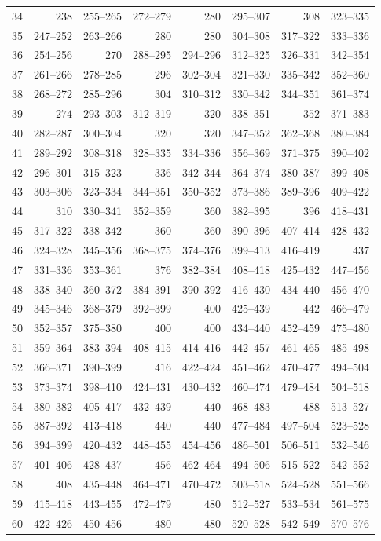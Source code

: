 \begin{longtable}{@{}r*{7}{r}@{}}
34&\(238\)&255--265&272--279&\(280\)&295--307&\(308\)&323--335\\
35&247--252&263--266&\(280\)&\(280\)&304--308&317--322&333--336\\
36&254--256&\(270\)&288--295&294--296&312--325&326--331&342--354\\
37&261--266&278--285&\(296\)&302--304&321--330&335--342&352--360\\
38&268--272&285--296&\(304\)&310--312&330--342&344--351&361--374\\
39&\(274\)&293--303&312--319&\(320\)&338--351&\(352\)&371--383\\
40&282--287&300--304&\(320\)&\(320\)&347--352&362--368&380--384\\
41&289--292&308--318&328--335&334--336&356--369&371--375&390--402\\
42&296--301&315--323&\(336\)&342--344&364--374&380--387&399--408\\
43&303--306&323--334&344--351&350--352&373--386&389--396&409--422\\
44&\(310\)&330--341&352--359&\(360\)&382--395&\(396\)&418--431\\
45&317--322&338--342&\(360\)&\(360\)&390--396&407--414&428--432\\
46&324--328&345--356&368--375&374--376&399--413&416--419&\(437\)\\
47&331--336&353--361&\(376\)&382--384&408--418&425--432&447--456\\
48&338--340&360--372&384--391&390--392&416--430&434--440&456--470\\
49&345--346&368--379&392--399&\(400\)&425--439&\(442\)&466--479\\
50&352--357&375--380&\(400\)&\(400\)&434--440&452--459&475--480\\
51&359--364&383--394&408--415&414--416&442--457&461--465&485--498\\
52&366--371&390--399&\(416\)&422--424&451--462&470--477&494--504\\
53&373--374&398--410&424--431&430--432&460--474&479--484&504--518\\
54&380--382&405--417&432--439&\(440\)&468--483&\(488\)&513--527\\
55&387--392&413--418&\(440\)&\(440\)&477--484&497--504&523--528\\
56&394--399&420--432&448--455&454--456&486--501&506--511&532--546\\
57&401--406&428--437&\(456\)&462--464&494--506&515--522&542--552\\
58&\(408\)&435--448&464--471&470--472&503--518&524--528&551--566\\
59&415--418&443--455&472--479&\(480\)&512--527&533--534&561--575\\
60&422--426&450--456&\(480\)&\(480\)&520--528&542--549&570--576\\
\end{longtable}
